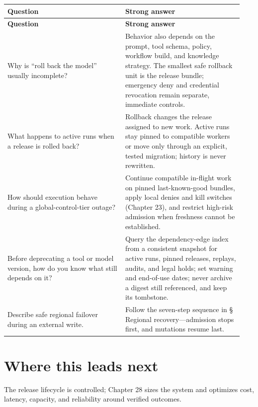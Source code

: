 \BookTableStart
\small
\begin{longtable}{@{}Y{0.4700\linewidth}Y{0.4700\linewidth}@{}}
\color{white}\bfseries \textbf{Question} & \color{white}\bfseries \textbf{Strong answer} \\
\endfirsthead
{}
\color{white}\bfseries \textbf{Question} & \color{white}\bfseries \textbf{Strong answer} \\
\endhead
Why is “roll back the model” usually incomplete? & Behavior also depends on the prompt, tool schema, policy, workflow build, and knowledge strategy. The smallest safe rollback unit is the release bundle; emergency deny and credential revocation remain separate, immediate controls. \\
What happens to active runs when a release is rolled back? & Rollback changes the release assigned to new work. Active runs stay pinned to compatible workers or move only through an explicit, tested migration; history is never rewritten. \\
How should execution behave during a global-control-tier outage? & Continue compatible in-flight work on pinned last-known-good bundles, apply local denies and kill switches (Chapter 23), and restrict high-risk admission when freshness cannot be established. \\
Before deprecating a tool or model version, how do you know what still depends on it? & Query the dependency-edge index from a consistent snapshot for active runs, pinned releases, replays, audits, and legal holds; set warning and end-of-use dates; never archive a digest still referenced, and keep its tombstone. \\
Describe safe regional failover during an external write. & Follow the seven-step sequence in § Regional recovery—admission stops first, and mutations resume last. \\
\end{longtable}
\BookTableEnd

\section{Where this leads next}

The release lifecycle is controlled; Chapter 28 sizes the system and optimizes cost, latency, capacity, and reliability around verified outcomes.\par



